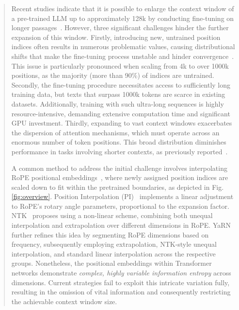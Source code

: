 \begin{abstract}
Recent studies indicate that it is possible to enlarge the context window of a pre-trained LLM up to approximately 128k by conducting fine-tuning on longer passages~\cite{longlora,pi,yarn,zhang2024soaring,liu2023scaling}. However, three significant challenges hinder the further expansion of this window. Firstly, introducing new, untrained position indices often results in numerous problematic values, causing distributional shifts that make the fine-tuning process unstable and hinder convergence~\cite{pi}. This issue is particularly pronounced when scaling from 4k to over 1000k positions, as the majority (more than 90\%) of indices are untrained. Secondly, the fine-tuning procedure necessitates access to sufficiently long training data, but texts that surpass 1000k tokens are scarce in existing datasets. Additionally, training with such ultra-long sequences is highly resource-intensive, demanding extensive computation time and significant GPU investment. Thirdly, expanding to vast context windows exacerbates the dispersion of attention mechanisms, which must operate across an enormous number of token positions. This broad distribution diminishes performance in tasks involving shorter contexts, as previously reported~\cite{pi}.

A common method to address the initial challenge involves interpolating RoPE positional embeddings~\cite{rope,pi}, where newly assigned position indices are scaled down to fit within the pretrained boundaries, as depicted in Fig.\ref{fig:overview}. Position Interpolation (PI)~\cite{pi} implements a linear adjustment to RoPE’s rotary angle parameters, proportional to the expansion factor. NTK~\cite{ntk,dynamicntk} proposes using a non-linear scheme, combining both unequal interpolation and extrapolation over different dimensions in RoPE. YaRN~\cite{yarn} further refines this idea by segmenting RoPE dimensions based on frequency, subsequently employing extrapolation, NTK-style unequal interpolation, and standard linear interpolation across the respective groups. Nonetheless, the positional embeddings within Transformer networks demonstrate \emph{complex, highly variable information entropy} across dimensions. Current strategies fail to exploit this intricate variation fully, resulting in the omission of vital information and consequently restricting the achievable context window size.


\end{abstract}
